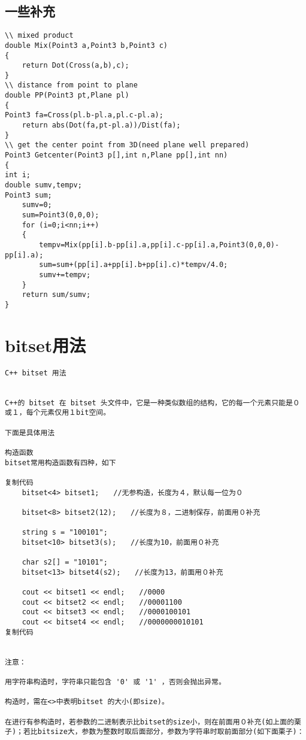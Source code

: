 \documentclass{article}
\begin{document}
\begin{CJK*}{UTF8}{song}
\begin{lstlisting}
\end{lstlisting}
\subsection{一些补充}
\begin{lstlisting}
\\ mixed product
double Mix(Point3 a,Point3 b,Point3 c)
{
	return Dot(Cross(a,b),c);
}
\\ distance from point to plane
double PP(Point3 pt,Plane pl)
{
Point3 fa=Cross(pl.b-pl.a,pl.c-pl.a);
	return abs(Dot(fa,pt-pl.a))/Dist(fa);
}
\\ get the center point from 3D(need plane well prepared)
Point3 Getcenter(Point3 p[],int n,Plane pp[],int nn)
{
int i;
double sumv,tempv;
Point3 sum;
	sumv=0;
	sum=Point3(0,0,0);
	for (i=0;i<nn;i++)
	{
		tempv=Mix(pp[i].b-pp[i].a,pp[i].c-pp[i].a,Point3(0,0,0)-pp[i].a);
		sum=sum+(pp[i].a+pp[i].b+pp[i].c)*tempv/4.0;
		sumv+=tempv;
	}
	return sum/sumv;
}
\end{lstlisting}
\section{bitset用法}
\begin{lstlisting}
C++ bitset 用法


C++的 bitset 在 bitset 头文件中，它是一种类似数组的结构，它的每一个元素只能是０或１，每个元素仅用１bit空间。

下面是具体用法

构造函数
bitset常用构造函数有四种，如下

复制代码
    bitset<4> bitset1;　　//无参构造，长度为４，默认每一位为０

    bitset<8> bitset2(12);　　//长度为８，二进制保存，前面用０补充

    string s = "100101";
    bitset<10> bitset3(s);　　//长度为10，前面用０补充

    char s2[] = "10101";
    bitset<13> bitset4(s2);　　//长度为13，前面用０补充

    cout << bitset1 << endl;　　//0000
    cout << bitset2 << endl;　　//00001100
    cout << bitset3 << endl;　　//0000100101
    cout << bitset4 << endl;　　//0000000010101
复制代码


注意：

用字符串构造时，字符串只能包含 '0' 或 '1' ，否则会抛出异常。

构造时，需在<>中表明bitset 的大小(即size)。

在进行有参构造时，若参数的二进制表示比bitset的size小，则在前面用０补充(如上面的栗子)；若比bitsize大，参数为整数时取后面部分，参数为字符串时取前面部分(如下面栗子)：


\end{lstlisting}
\end{CJK*}
\end{document}
